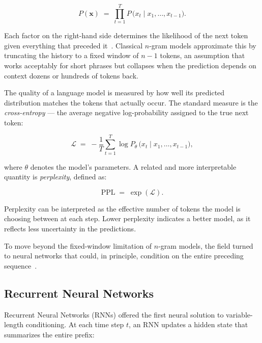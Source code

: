 \begin{equation}
    P(\mathbf{x}) \;=\; \prod_{t=1}^{T}
    P\,\bigl(x_t \mid x_1, \dots, x_{t-1}\bigr).
    \label{eq:chain-rule}
\end{equation}

Each factor on the right-hand side determines the likelihood of the next token given everything that preceded it~\cite{jm3}. Classical $n$-gram models approximate this by truncating the history to a fixed window of $n{-}1$ tokens, an assumption that works acceptably for short phrases but collapses when the prediction depends on context dozens or hundreds of tokens back.

The quality of a language model is measured by how well its predicted distribution matches the tokens that actually occur. The standard measure is the \emph{cross-entropy} --- the average negative log-probability assigned to the true next token:

\begin{equation}
    \mathcal{L} \;=\; -\frac{1}{T}\sum_{t=1}^{T}
    \log P_\theta\,\bigl(x_t \mid x_1, \dots, x_{t-1}\bigr),
    \label{eq:nll}
\end{equation}

where $\theta$ denotes the model's parameters. A related and more interpretable quantity is \emph{perplexity}, defined as:

\begin{equation}
    \text{PPL} \;=\; \exp(\mathcal{L}).
    \label{eq:perplexity}
\end{equation}

Perplexity can be interpreted as the effective number of tokens the model is choosing between at each step. Lower perplexity indicates a better model, as it reflects less uncertainty in the predictions.

To move beyond the fixed-window limitation of $n$-gram models, the field turned to neural networks that could, in principle, condition on the entire preceding sequence~\cite{hindle2012naturalness}.

\subsection{Recurrent Neural Networks}
\label{subsec:rnn}

Recurrent Neural Networks (RNNs) offered the first neural solution to variable-length conditioning. At each time step $t$, an RNN updates a hidden state that summarizes the entire prefix:

